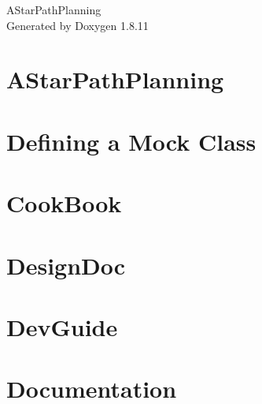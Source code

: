 \documentclass[twoside]{book}
\newcommand{\+}{\discretionary{\mbox{\scriptsize$\hookleftarrow$}}{}{}}
\newcommand{\clearemptydoublepage}{%
  \newpage{\pagestyle{empty}\cleardoublepage}%
}
\begin{document}
\hypersetup{pageanchor=false,
             bookmarksnumbered=true,
             pdfencoding=unicode
            }
\begin{titlepage}
\vspace*{7cm}
\begin{center}%
{\Large A\+Star\+Path\+Planning }\\
\vspace*{1cm}
{\large Generated by Doxygen 1.8.11}\\
\end{center}
\end{titlepage}
\clearemptydoublepage
\tableofcontents
\clearemptydoublepage
{}
\hypersetup{pageanchor=true}

\chapter{A\+Star\+Path\+Planning}
\label{md_README}
\hypertarget{md_README}{}

\chapter{Defining a Mock Class}
\label{md_vendor_googletest_googlemock_docs_CheatSheet}
\hypertarget{md_vendor_googletest_googlemock_docs_CheatSheet}{}

\chapter{Cook\+Book}
\label{md_vendor_googletest_googlemock_docs_CookBook}
\hypertarget{md_vendor_googletest_googlemock_docs_CookBook}{}

\chapter{Design\+Doc}
\label{md_vendor_googletest_googlemock_docs_DesignDoc}
\hypertarget{md_vendor_googletest_googlemock_docs_DesignDoc}{}

\chapter{Dev\+Guide}
\label{md_vendor_googletest_googlemock_docs_DevGuide}
\hypertarget{md_vendor_googletest_googlemock_docs_DevGuide}{}

\chapter{Documentation}
\label{md_vendor_googletest_googlemock_docs_Documentation}
\hypertarget{md_vendor_googletest_googlemock_docs_Documentation}{}

\end{document}
